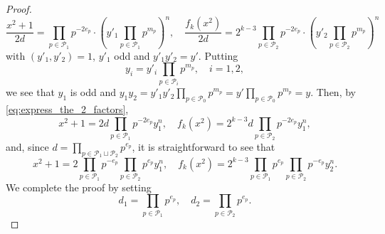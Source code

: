 \documentclass[10pt,a4paper]{amsart}
\newcommand{\cP}{\mathcal{P}}
\begin{document}
\begin{proof}
\begin{equation}  \label{eq:express_the_2_factors}
\frac{x^2+1}{2d}=
\prod_{p\in \cP_1}p^{-2e_p}\cdot
\left(y'_1\prod_{p\in \cP_1}p^{m_p}\right)^n,
\quad
 \frac{f_k(x^2)}{2d} = 2^{k-3}
    \prod_{p\in \cP_2}p^{-2e_p}\cdot
    \left(y'_2\prod_{p\in \cP_2}p^{m_p}\right)^n
\end{equation}
%
with $(y'_1,y'_2)=1$, $y'_1$ odd and $y'_1y'_2=y'$.
Putting
%
\begin{equation*}
    y_i = y'_i\prod_{p\in \cP_i}p^{m_p},\quad i=1,2,
\end{equation*}
%
we see that $y_1$ is odd and
$y_1y_2=y'_1y'_2\prod_{p\in \cP_0}p^{m_p}=y'\prod_{p\in \cP_0}p^{m_p}=y$.
Then, by \eqref{eq:express_the_2_factors},
\begin{equation*}
x^2+1=2d\prod_{p\in\cP_1}p^{-2e_p}y_1^n,\quad
f_k(x^2)=2^{k-3}d\prod_{p\in\cP_2}p^{-2e_p}y_1^n,
\end{equation*}
and, since $d=\prod_{p\in\cP_1\sqcup\cP_2}p^{e_p}$, it is 
straightforward to see that
\begin{equation*}
x^2+1=2\prod_{p\in\cP_1}p^{-e_p}\prod_{p\in\cP_2}p^{e_p}y_1^n,
\quad
f_k(x^2)= 2^{k-3}\prod_{p\in\cP_1}p^{e_p}\prod_{p\in\cP_2}p^{-e_p}y_2^n.
\end{equation*}
We complete the proof by setting 
\begin{equation*}
d_1= \prod_{p\in\cP_1}p^{e_p},\quad d_2 = \prod_{p\in\cP_2}p^{e_p}.
\end{equation*}
\end{proof}
\end{document}
